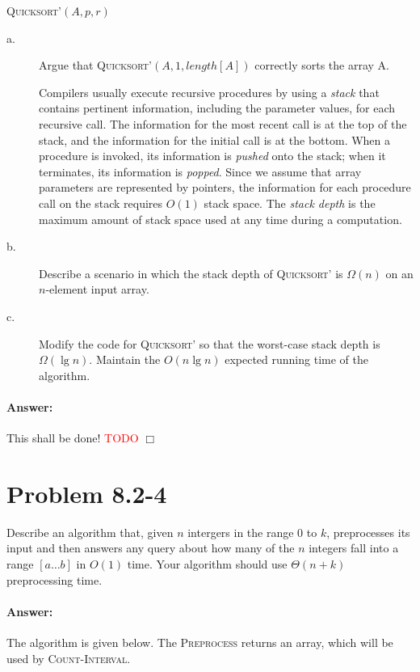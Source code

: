 \documentclass[a4paper,10pt]{article}
\newcommand{\problem}[1]{\section*{Problem #1}}
\newcommand{\answer}{\paragraph{Answer:}}
\newcommand{\qed}{\hfill \ensuremath{\Box}}
\newcommand{\todo}{\textcolor{red}{TODO}{} }
\begin{document}
\begin{algorithm}[H]
  \caption{\textsc{Quicksort'$(A, p, r)$}}
\end{algorithm}

\begin{description}
\item[a. \hspace{9pt}] Argue that \textsc{Quicksort'}$(A, 1, length[A])$ correctly sorts the array A.

Compilers usually execute recursive procedures by using a \emph{stack} that contains pertinent information, including
the parameter values, for each recursive call. The information for the most recent call is at the top of the stack,
and the information for the initial call is at the bottom. When a procedure is invoked, its information is \emph{pushed}
 onto the stack; when it terminates, its information is \emph{popped}. Since we assume that array parameters are
 represented by pointers, the information for each procedure call on the stack requires $O(1)$ stack space.
 The \emph{stack depth} is the maximum amount of stack space used at any time during a computation.

\item[b. \hspace{9pt}] Describe a scenario in which the stack depth of \textsc{Quicksort'} is $\Omega(n)$ on an 
$n$-element input array.

\item[c. \hspace{9pt}] Modify the code for \textsc{Quicksort'} so that the worst-case stack depth is $\Omega(\lg n)$.
Maintain the $O(n\lg n)$ expected running time of the algorithm.

\end{description}

\answer

This shall be done!
\todo
\qed

\problem{8.2-4}
Describe an algorithm that, given $n$ intergers in the range 0 to $k$, preprocesses its input and then answers
any query about how many of the $n$ integers fall into a range
$[a\ldots b]$ in $O(1)$ time. Your algorithm should use $\Theta(n + k)$ preprocessing time.
\answer

The algorithm is given below. The \textsc{Preprocess} returns an array, which will be used by \textsc{Count-Interval}.
\end{document}
